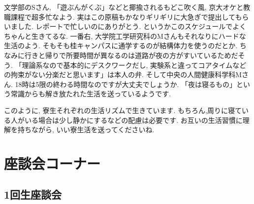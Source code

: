 \documentclass[10pt,b5jsbook,dvips,dvipdfmx,openany]{jsbook}
\theoremstyle{definition}
\begin{document}
			文学部のSさん, 「遊ぶんがくぶ」などと揶揄されるもどこ吹く風, 京大オケと教職課程で超多忙なよう. 実はこの原稿もかなりギリギリに大急ぎで提出してもらいました. レポートで忙しいのにありがとう. というかこのスケジュールでよくちゃんと生きてるな. 一番右, 大学院工学研究科のMさんもそれなりにハードな生活のよう. そもそも桂キャンパスに通学するのが結構体力を使うのだとか. ちなみに行きと帰りで所要時間が異なるのは道路が夜の方がすいているためだそう. 「理論系なので基本的にデスクワークだし, 実験系と違ってコアタイムなどの拘束がない分楽だと思います」は本人の弁. そして中央の人間健康科学科Mさん. 18時は5限の終わる時間なのですが大丈夫でしょうか. 「夜は寝るもの」という常識からも解き放たれた生活を送っているようです.

			このように, 寮生それぞれの生活リズムで生きています. もちろん,周りに寝ている人がいる場合は少し静かにするなどの配慮は必要です. お互いの生活習慣に理解を持ちながら, いい寮生活を送ってくださいね.

\newpage
	\section{座談会コーナー}

	\setcounter{footnote}{0}

		\subsection{1回生座談会}
    \label{page:座談会}
\end{document}
